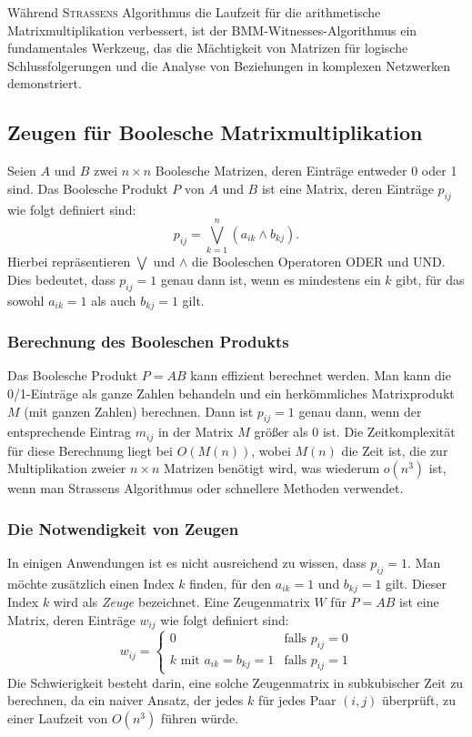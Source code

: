 \documentclass{scrartcl}
\numberwithin{equation}{section}
\begin{document}
Während \textsc{Strassens} Algorithmus die Laufzeit für die arithmetische Matrixmultiplikation verbessert, ist der BMM-Witnesses-Algorithmus ein fundamentales Werkzeug, das die Mächtigkeit von Matrizen für logische Schlussfolgerungen und die Analyse von Beziehungen in komplexen Netzwerken demonstriert.

\subsection{Zeugen für Boolesche Matrixmultiplikation}

Seien $A$ und $B$ zwei $n \times n$ Boolesche Matrizen, deren Einträge entweder 0 oder 1 sind. Das Boolesche Produkt $P$ von $A$ und $B$ ist eine Matrix, deren Einträge $p_{ij}$ wie folgt definiert sind:
$$p_{ij}=\bigvee_{k=1}^{n}(a_{ik}\wedge b_{kj}).$$
Hierbei repräsentieren $\bigvee$ und $\wedge$ die Booleschen Operatoren ODER und UND. Dies bedeutet, dass $p_{ij}=1$ genau dann ist, wenn es mindestens ein $k$ gibt, für das sowohl $a_{ik}=1$ als auch $b_{kj}=1$ gilt.

\subsubsection{Berechnung des Booleschen Produkts}
Das Boolesche Produkt $P=AB$ kann effizient berechnet werden. Man kann die 0/1-Einträge als ganze Zahlen behandeln und ein herkömmliches Matrixprodukt $M$ (mit ganzen Zahlen) berechnen. Dann ist $p_{ij}=1$ genau dann, wenn der entsprechende Eintrag $m_{ij}$ in der Matrix $M$ größer als 0 ist. Die Zeitkomplexität für diese Berechnung liegt bei $O(M(n))$, wobei $M(n)$ die Zeit ist, die zur Multiplikation zweier $n \times n$ Matrizen benötigt wird, was wiederum $o(n^3)$ ist, wenn man Strassens Algorithmus oder schnellere Methoden verwendet.

\subsubsection{Die Notwendigkeit von Zeugen}
In einigen Anwendungen ist es nicht ausreichend zu wissen, dass $p_{ij}=1$. Man möchte zusätzlich einen Index $k$ finden, für den $a_{ik}=1$ und $b_{kj}=1$ gilt. Dieser Index $k$ wird als \textit{Zeuge} bezeichnet. Eine Zeugenmatrix $W$ für $P=AB$ ist eine Matrix, deren Einträge $w_{ij}$ wie folgt definiert sind:
$$w_{ij}=\begin{cases} 0 & \text{falls } p_{ij}=0 \\ k \text{ mit } a_{ik}=b_{kj}=1 & \text{falls } p_{ij}=1 \end{cases}$$
Die Schwierigkeit besteht darin, eine solche Zeugenmatrix in subkubischer Zeit zu berechnen, da ein naiver Ansatz, der jedes $k$ für jedes Paar $(i, j)$ überprüft, zu einer Laufzeit von $O(n^3)$ führen würde.
\end{document}
